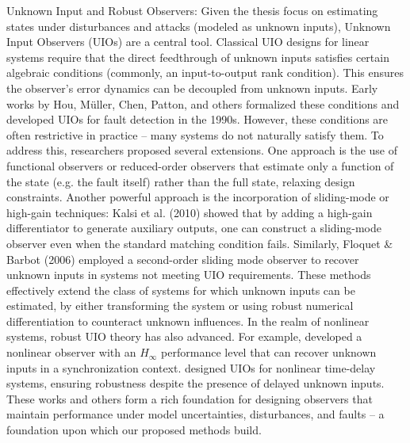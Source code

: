 Unknown Input and Robust Observers: Given the thesis focus on estimating states under disturbances and attacks (modeled as unknown inputs), Unknown Input Observers (UIOs) are a central tool. Classical UIO designs for linear systems require that the direct feedthrough of unknown inputs satisfies certain algebraic conditions (commonly, an input-to-output rank condition). This ensures the observer’s error dynamics can be decoupled from unknown inputs. Early works by Hou, Müller, Chen, Patton, and others formalized these conditions and developed UIOs for fault detection in the 1990s. However, these conditions are often restrictive in practice – many systems do not naturally satisfy them. To address this, researchers proposed several extensions. One approach is the use of functional observers or reduced-order observers that estimate only a function of the state (e.g. the fault itself) rather than the full state, relaxing design constraints. Another powerful approach is the incorporation of sliding-mode or high-gain techniques: Kalsi et al. (2010) showed that by adding a high-gain differentiator to generate auxiliary outputs, one can construct a sliding-mode observer even when the standard matching condition fails. Similarly, Floquet \& Barbot (2006) employed a second-order sliding mode observer to recover unknown inputs in systems not meeting UIO requirements. These methods effectively extend the class of systems for which unknown inputs can be estimated, by either transforming the system or using robust numerical differentiation to counteract unknown influences. In the realm of nonlinear systems, robust UIO theory has also advanced. For example, \cite{ZEMOUCHE2009282} developed a nonlinear observer with an $H_\infty$ performance level that can recover unknown inputs in a synchronization context. \cite{Hassan2013} designed UIOs for nonlinear time-delay systems, ensuring robustness despite the presence of delayed unknown inputs. These works and others form a rich foundation for designing observers that maintain performance under model uncertainties, disturbances, and faults – a foundation upon which our proposed methods build.

